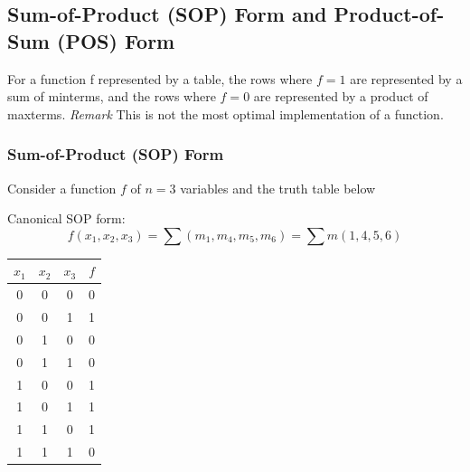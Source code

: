\documentclass[12pt,openany, tikz,border=10pt]{book}
\begin{document}
			      	
			      	
			      	\newpage
			      	\subsection{Sum-of-Product (SOP) Form and Product-of-Sum (POS) Form}
			      	For a function f represented by a table, the rows where $f=1$ are represented by a sum of minterms, and the rows where $f=0$ are represented by a product of maxterms. \newline
			      	\textit{Remark} This is not the most optimal implementation of a function. \newline
			      	
			      	\subsubsection{Sum-of-Product (SOP) Form}
			      	\vspace*{10px}
			      	Consider a function \( f \) of \( n = 3 \) variables and the truth table below
			      	
			      	Canonical SOP form:
			      	\[
			      		f(x_1, x_2, x_3) = \sum (m_1, m_4, m_5, m_6) = \sum m(1, 4, 5, 6)
			      	\]
			      	
			      	\begin{center}
			      		\begin{tabular}{|c|c|c|c|}
			      			\hline
			      			\( x_1 \) & \( x_2 \) & \( x_3 \) & \( f \) \\
			      			\hline
			      			0         & 0         & 0         & 0       \\
			      			\hline
			      			\rowcolor{blue!25}
			      			0         & 0         & 1         & 1       \\
			      			\hline
			      			0         & 1         & 0         & 0       \\
			      			\hline
			      			0         & 1         & 1         & 0       \\
			      			\hline
			      			\rowcolor{blue!25}
			      			1         & 0         & 0         & 1       \\
			      			\hline
			      			\rowcolor{blue!25}
			      			1         & 0         & 1         & 1       \\
			      			\hline
			      			\rowcolor{blue!25}
			      			1         & 1         & 0         & 1       \\
			      			\hline
			      			1         & 1         & 1         & 0       \\
			      			\hline
			      		\end{tabular}
			      	\end{center}
			      	
\end{document}
